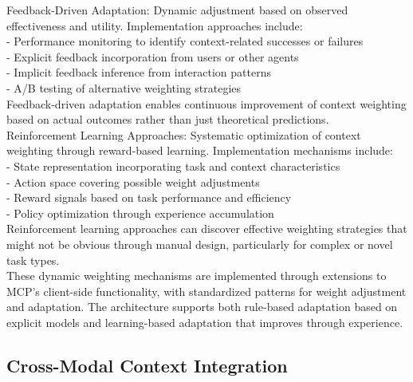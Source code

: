Feedback-Driven Adaptation: Dynamic adjustment based on observed effectiveness and utility. Implementation approaches include:\\ \newline
- Performance monitoring to identify context-related successes or failures\\ \newline
- Explicit feedback incorporation from users or other agents\\ \newline
- Implicit feedback inference from interaction patterns\\ \newline
- A/B testing of alternative weighting strategies\\ \newline
Feedback-driven adaptation enables continuous improvement of context weighting based on actual outcomes rather than just theoretical predictions.\\ \newline
Reinforcement Learning Approaches: Systematic optimization of context weighting through reward-based learning. Implementation mechanisms include:\\ \newline
- State representation incorporating task and context characteristics\\ \newline
- Action space covering possible weight adjustments\\ \newline
- Reward signals based on task performance and efficiency\\ \newline
- Policy optimization through experience accumulation\\ \newline
Reinforcement learning approaches can discover effective weighting strategies that might not be obvious through manual design, particularly for complex or novel task types.\\ \newline
These dynamic weighting mechanisms are implemented through extensions to MCP's client-side functionality, with standardized patterns for weight adjustment and adaptation. The architecture supports both rule-based adaptation based on explicit models and learning-based adaptation that improves through experience.\\
\subsection{Cross-Modal Context Integration}

